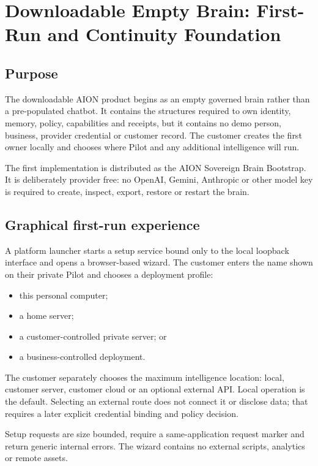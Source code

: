 \section{Downloadable Empty Brain: First-Run and Continuity Foundation}
\label{sec:aion-empty-brain-bootstrap}

\subsection{Purpose}

The downloadable AION product begins as an empty governed brain rather than a
pre-populated chatbot.  It contains the structures required to own identity,
memory, policy, capabilities and receipts, but it contains no demo person,
business, provider credential or customer record.  The customer creates the
first owner locally and chooses where Pilot and any additional intelligence will
run.

The first implementation is distributed as the AION Sovereign Brain Bootstrap.
It is deliberately provider free: no OpenAI, Gemini, Anthropic or other model key
is required to create, inspect, export, restore or restart the brain.

\subsection{Graphical first-run experience}

A platform launcher starts a setup service bound only to the local loopback
interface and opens a browser-based wizard.  The customer enters the name shown
on their private Pilot and chooses a deployment profile:

\begin{itemize}
  \item this personal computer;
  \item a home server;
  \item a customer-controlled private server; or
  \item a business-controlled deployment.
\end{itemize}

The customer separately chooses the maximum intelligence location: local,
customer server, customer cloud or an optional external API.  Local operation is
the default.  Selecting an external route does not connect it or disclose data;
that requires a later explicit credential binding and policy decision.

Setup requests are size bounded, require a same-application request marker and
return generic internal errors.  The wizard contains no external scripts,
analytics or remote assets.

